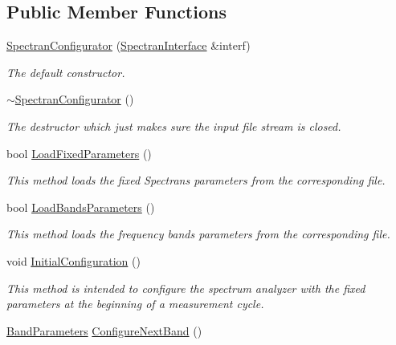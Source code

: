 \subsection*{Public Member Functions}
\begin{DoxyCompactItemize}
\item 
\hyperlink{classSpectranConfigurator_af6a9f524ea5625e6e30be0e843c17c8a}{Spectran\+Configurator} (\hyperlink{classSpectranInterface}{Spectran\+Interface} \&interf)
\begin{DoxyCompactList}\small\item\em The default constructor. \end{DoxyCompactList}\item 
\mbox{\label{classSpectranConfigurator_aa697b14d994a5d0fabe2639036f70dc8}} 
\hyperlink{classSpectranConfigurator_aa697b14d994a5d0fabe2639036f70dc8}{$\sim$\+Spectran\+Configurator} ()
\begin{DoxyCompactList}\small\item\em The destructor which just makes sure the input file stream is closed. \end{DoxyCompactList}\item 
bool \hyperlink{classSpectranConfigurator_ab3dfc0843d10b2e9bad09f599165d6ff}{Load\+Fixed\+Parameters} ()
\begin{DoxyCompactList}\small\item\em This method loads the fixed Spectran\textquotesingle{}s parameters from the corresponding file. \end{DoxyCompactList}\item 
bool \hyperlink{classSpectranConfigurator_a9171d48390718bd6f2d05922ee6596cd}{Load\+Bands\+Parameters} ()
\begin{DoxyCompactList}\small\item\em This method loads the frequency bands parameters from the corresponding file. \end{DoxyCompactList}\item 
void \hyperlink{classSpectranConfigurator_ad2deb73f4c1691cd8bff29b810f8f42b}{Initial\+Configuration} ()
\begin{DoxyCompactList}\small\item\em This method is intended to configure the spectrum analyzer with the fixed parameters at the beginning of a measurement cycle. \end{DoxyCompactList}\item 
\hyperlink{structBandParameters}{Band\+Parameters} \hyperlink{classSpectranConfigurator_a4bea5937bcf7c904c3eb435a2d25e3fb}{Configure\+Next\+Band} ()

\end{DoxyCompactItemize}
